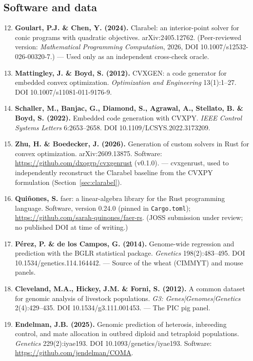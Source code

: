 \documentclass[11pt]{article}
\begin{document}
\subsection*{Software and data}
\begin{enumerate}\setcounter{enumi}{11}
\item \textbf{Goulart, P.J. \& Chen, Y. (2024).} Clarabel: an interior-point solver for conic programs with quadratic objectives. arXiv:2405.12762. (Peer-reviewed version: \emph{Mathematical Programming Computation}, 2026, DOI 10.1007/s12532-026-00320-7.) --- Used only as an independent cross-check oracle.
\item \textbf{Mattingley, J. \& Boyd, S. (2012).} CVXGEN: a code generator for embedded convex optimization. \emph{Optimization and Engineering} 13(1):1--27. DOI 10.1007/s11081-011-9176-9.
\item \textbf{Schaller, M., Banjac, G., Diamond, S., Agrawal, A., Stellato, B. \& Boyd, S. (2022).} Embedded code generation with CVXPY. \emph{IEEE Control Systems Letters} 6:2653--2658. DOI 10.1109/LCSYS.2022.3173209.
\item \textbf{Zhu, H. \& Boedecker, J. (2026).} Generation of custom solvers in Rust for convex optimization. arXiv:2609.13875. Software: \url{https://github.com/dxogrp/cvxgenrust} (v0.1.0). --- cvxgenrust, used to independently reconstruct the Clarabel baseline from the CVXPY formulation (Section~\ref{sec:clarabel}).
\item \textbf{Quiñones, S.} faer: a linear-algebra library for the Rust programming language. Software, version 0.24.0 (pinned in \texttt{Cargo.toml}); \url{https://github.com/sarah-quinones/faer-rs}. (JOSS submission under review; no published DOI at time of writing.)
\item \textbf{Pérez, P. \& de los Campos, G. (2014).} Genome-wide regression and prediction with the BGLR statistical package. \emph{Genetics} 198(2):483--495. DOI 10.1534/genetics.114.164442. --- Source of the wheat (CIMMYT) and mouse panels.
\item \textbf{Cleveland, M.A., Hickey, J.M. \& Forni, S. (2012).} A common dataset for genomic analysis of livestock populations. \emph{G3: Genes|Genomes|Genetics} 2(4):429--435. DOI 10.1534/g3.111.001453. --- The PIC pig panel.
\item \textbf{Endelman, J.B. (2025).} Genomic prediction of heterosis, inbreeding control, and mate allocation in outbred diploid and tetraploid populations. \emph{Genetics} 229(2):iyae193. DOI 10.1093/genetics/iyae193. Software: \url{https://github.com/jendelman/COMA}.
\end{enumerate}
\end{document}
